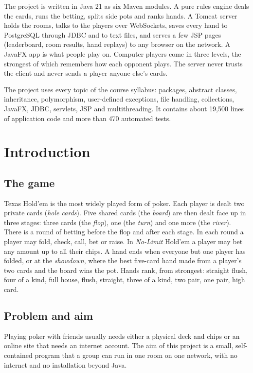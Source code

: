 \documentclass[12pt,a4paper]{article}
\begin{document}
The project is written in Java 21 as six Maven modules. A pure rules engine deals the cards,
runs the betting, splits side pots and ranks hands. A Tomcat server holds the rooms, talks to
the players over WebSockets, saves every hand to PostgreSQL through JDBC and to text files, and
serves a few JSP pages (leaderboard, room results, hand replays) to any browser on the network.
A JavaFX app is what people play on. Computer players come in three levels, the strongest of
which remembers how each opponent plays. The server never trusts the client and never sends a
player anyone else's cards.

The project uses every topic of the course syllabus: packages, abstract classes, inheritance,
polymorphism, user-defined exceptions, file handling, collections, JavaFX, JDBC, servlets, JSP
and multithreading. It contains about 19,500 lines of application code and more than 470
automated tests.

\newpage
{\singlespacing\tableofcontents}
\newpage

\section{Introduction}

\subsection{The game}
Texas Hold'em is the most widely played form of poker. Each player is dealt two private cards
(\emph{hole cards}). Five shared cards (the \emph{board}) are then dealt face up in three
stages: three cards (the \emph{flop}), one (the \emph{turn}) and one more (the \emph{river}).
There is a round of betting before the flop and after each stage. In each round a player may
fold, check, call, bet or raise. In \emph{No-Limit} Hold'em a player may bet any amount up to
all their chips. A hand ends when everyone but one player has folded, or at the
\emph{showdown}, where the best five-card hand made from a player's two cards and the board wins
the pot. Hands rank, from strongest: straight flush, four of a kind, full house, flush, straight,
three of a kind, two pair, one pair, high card.

\subsection{Problem and aim}
Playing poker with friends usually needs either a physical deck and chips or an online site
that needs an internet account. The aim of this project is a small, self-contained program that
a group can run in one room on one network, with no internet and no installation beyond Java.
\end{document}
